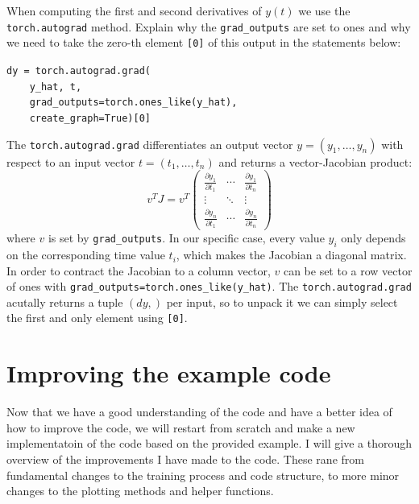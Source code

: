 \documentclass[we,twoside,openright,a4paper,11pt]{uantwerpenbamathesis}
\begin{document}
\begin{tcolorbox}[title=Question 9, colback=blue!10!white, colframe=blue!40!white, sharp corners]
    When computing the first and second derivatives of $y(t)$ we use the \verb|torch.autograd| method. Explain why the \verb|grad_outputs| are set to ones and why we need to take the zero-th element \verb|[0]| of this output in the statements below:
    \begin{tcolorbox}[colback=gray!10!white, colframe=gray!40!white]
        \verb|dy = torch.autograd.grad(|\\
        \verb|    y_hat, t,|\\
        \verb|    grad_outputs=torch.ones_like(y_hat),|\\
        \verb|    create_graph=True)[0]|
    \end{tcolorbox}
\end{tcolorbox}
The \verb|torch.autograd.grad| differentiates an output vector $y=(y_1, \ldots, y_n)$ with respect to an input vector $t=(t_1, \ldots, t_n)$ and returns a vector-Jacobian product:
\begin{equation}
    v^TJ =  v^T
    \begin{pmatrix}
        \frac{\partial y_1}{\partial t_1} & \cdots & \frac{\partial y_1}{\partial t_n} \\
        \vdots & \ddots & \vdots \\
        \frac{\partial y_n}{\partial t_1} & \cdots & \frac{\partial y_n}{\partial t_n}
    \end{pmatrix}
\end{equation}
where $v$ is set by \verb|grad_outputs|. In our specific case, every value $y_i$ only depends on the corresponding time value $t_i$, which makes the Jacobian a diagonal matrix. In order to contract the Jacobian to a column vector, $v$ can be set to a row vector of ones with \verb|grad_outputs=torch.ones_like(y_hat)|. The \verb|torch.autograd.grad| acutally returns a tuple $(dy,)$ per input, so to unpack it we can simply select the first and only element using \verb|[0]|.

\section{Improving the example code}
Now that we have a good understanding of the code and have a better idea of how to improve the code, we will restart from scratch and make a new implementatoin of the code based on the provided example. I will give a thorough overview of the improvements I have made to the code. These rane from fundamental changes to the training process and code structure, to more minor changes to the plotting methods and helper functions.
\end{document}
